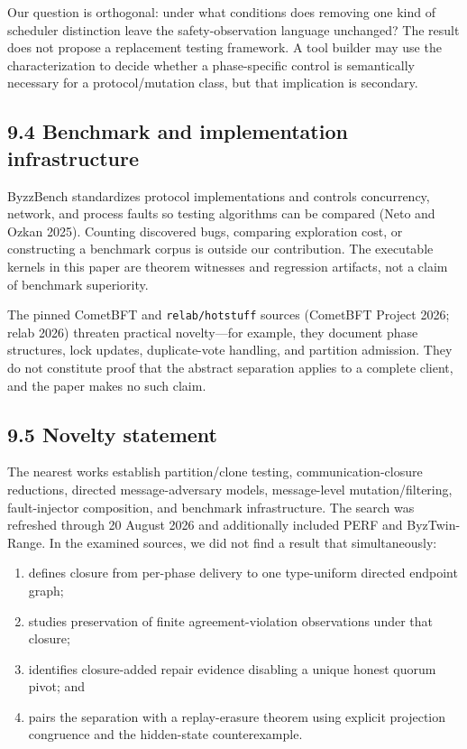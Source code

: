 \documentclass[10pt,a4paper]{article}
\newcommand{\tightlist}{\setlength{\itemsep}{0pt}\setlength{\parskip}{0pt}}
\begin{document}
Our question is orthogonal: under what conditions does removing one kind
of scheduler distinction leave the safety-observation language
unchanged? The result does not propose a replacement testing framework.
A tool builder may use the characterization to decide whether a
phase-specific control is semantically necessary for a protocol/mutation
class, but that implication is secondary.

\subsection{9.4 Benchmark and implementation
infrastructure}\label{benchmark-and-implementation-infrastructure}

ByzzBench standardizes protocol implementations and controls
concurrency, network, and process faults so testing algorithms can be
compared (Neto and Ozkan 2025). Counting discovered bugs, comparing
exploration cost, or constructing a benchmark corpus is outside our
contribution. The executable kernels in this paper are theorem witnesses
and regression artifacts, not a claim of benchmark superiority.

The pinned CometBFT and \texttt{relab/hotstuff} sources (CometBFT
Project 2026; relab 2026) threaten practical novelty---for example, they
document phase structures, lock updates, duplicate-vote handling, and
partition admission. They do not constitute proof that the abstract
separation applies to a complete client, and the paper makes no such
claim.

\subsection{9.5 Novelty statement}\label{novelty-statement}

The nearest works establish partition/clone testing,
communication-closure reductions, directed message-adversary models,
message-level mutation/filtering, fault-injector composition, and
benchmark infrastructure. The search was refreshed through 20 August
2026 and additionally included PERF and ByzTwin-Range. In the examined
sources, we did not find a result that simultaneously:

\begin{enumerate}
\def\labelenumi{\arabic{enumi}.}
\tightlist
\item
  defines closure from per-phase delivery to one type-uniform directed
  endpoint graph;
\item
  studies preservation of finite agreement-violation observations under
  that closure;
\item
  identifies closure-added repair evidence disabling a unique honest
  quorum pivot; and
\item
  pairs the separation with a replay-erasure theorem using explicit
  projection congruence and the hidden-state counterexample.
\end{enumerate}
\end{document}

